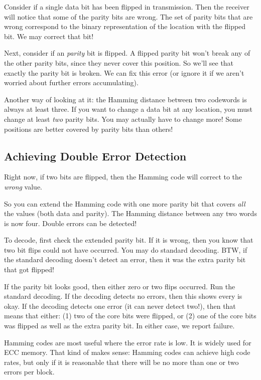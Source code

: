 \documentclass[11pt, oneside]{amsart}
\begin{document}
Consider if a single data bit has been flipped in transmission. Then the
receiver will notice that some of the parity bits are wrong. The set of
parity bits that are wrong correspond to the binary representation of
the location with the flipped bit. We may correct that bit!

Next, consider if an \emph{parity} bit is flipped. A flipped parity bit
won't break any of the other parity bits, since they never cover this
position. So we'll see that exactly the parity bit is broken. We can fix
this error (or ignore it if we aren't worried about further errors
accumulating).

Another way of looking at it: the Hamming distance between two codewords
is always at least three. If you want to change a data bit at any
location, you must change at least \emph{two} parity bits. You may
actually have to change more! Some positions are better covered by
parity bits than others!

\subsection{Achieving Double Error Detection}

Right now, if two bits are flipped, then the Hamming code will correct
to the \emph{wrong} value.

So you can extend the Hamming code with one more parity bit that covers
\emph{all} the values (both data and parity). The Hamming distance
between any two words is now four. Double errors can be detected!

To decode, first check the extended parity bit. If it is wrong, then you
know that two bit flips could not have occurred. You may do standard
decoding. BTW, if the standard decoding doesn't detect an error, then it
was the extra parity bit that got flipped!

If the parity bit looks good, then either zero or two flips occurred.
Run the standard decoding. If the decoding detects no errors, then this
shows every is okay. If the decoding detects one error (it can never
detect two!), then that means that either: (1) two of the core bits were
flipped, or (2) one of the core bits was flipped as well as the extra
parity bit. In either case, we report failure.

Hamming codes are most useful where the error rate is low. It is widely
used for ECC memory. That kind of makes sense: Hamming codes can achieve
high code rates, but only if it is reasonable that there will be no more
than one or two errors per block.
\end{document}
